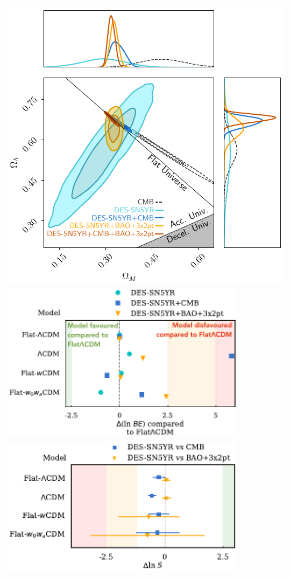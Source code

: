 \documentclass[aspectratio=169]{beamer}
\begin{document}
\begin{frame}
\begin{columns}
\begin{enumerate}
        \end{enumerate}
        \hfill\includegraphics[width=0.6\textwidth]{figures/des_parameters.pdf}
        \includegraphics[width=0.5\textwidth]{figures/des_model_comparison.pdf}%
        \includegraphics[width=0.5\textwidth]{figures/des_suspiciousness.pdf}
    \end{columns}
\end{frame}
\end{document}
